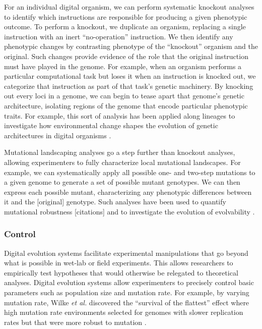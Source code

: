 For an individual digital organism, we can perform systematic knockout analyses to identify which instructions are responsible for producing a given phenotypic outcome.
To perform a knockout, we duplicate an organism, replacing a single instruction with an inert ``no-operation'' instruction.
We then identify any phenotypic changes by contrasting phenotype of the ``knockout'' organism and the original.
Such changes provide evidence of the role that the original instruction must have played in the genome.
For example, when an organism performs a particular computational task but loses it when an instruction is knocked out, we categorize that instruction as part of that task's genetic machinery.
By knocking out every loci in a genome, we can begin to tease apart that genome's genetic architecture, isolating regions of the genome that encode particular phenotypic traits.
For example, this sort of analysis has been applied along lineages to investigate how environmental change shapes the evolution of genetic architectures in digital organisms \citep{canino-koning_evolution_2016}.

Mutational landscaping analyses go a step further than knockout analyses, allowing experimenters to fully characterize local mutational landscapes.
For example, we can systematically apply all possible one- and two-step mutations to a given genome to generate a set of possible mutant genotypes. 
We can then express each possible mutant, characterizing any phenotypic differences between it and the [original] genotype. %
Such analyses have been used to quantify mutational robustness [citations] and to investigate the evolution of evolvability \citep{canino-koning_fluctuating_2019}. 

\subsubsection{Control}

Digital evolution systems facilitate experimental manipulations that go beyond what is possible in wet-lab or field experiments.
This allows researchers to empirically test hypotheses that would otherwise be relegated to theoretical analyses.
Digital evolution systems allow experimenters to precisely control basic parameters such as population size and mutation rate.
For example, by varying mutation rate, Wilke \textit{et al.} discovered the ``survival of the flattest'' effect where high mutation rate environments selected for genomes with slower replication rates but that were more robust to mutation \citep{wilke_flattest_2001}. 

